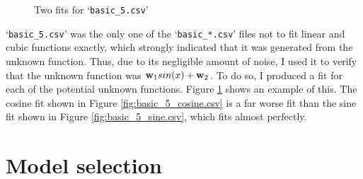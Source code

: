 \documentclass[onecolumn, 12pt, a4paper]{article}
\begin{document}
\begin{figure}[htbp]
    \centering
    \hfill
    \caption{Two fits for `\texttt{basic\_5.csv}'}
    \label{fig:basic_5.csv}
\end{figure}

`\texttt{basic\_5.csv}' was the only one of the
`\texttt{basic\_*.csv}' files not to fit linear and
cubic functions exactly, which strongly indicated that it was generated from
the unknown function. 
Thus, due to its negligible amount of noise,
I used it to verify that the unknown function was
$\vb{w}_{1}sin(x) + \vb{w}_{2}$.
To do so, I produced a fit for each of the potential
unknown functions.
Figure \ref{fig:basic_5.csv} shows an example of this.
The cosine fit shown in Figure \ref{fig:basic_5_cosine.csv}
is a far worse fit than the sine fit shown in Figure
\ref{fig:basic_5_sine.csv}, which fits almost perfectly.

\section{Model selection}
\end{document}
